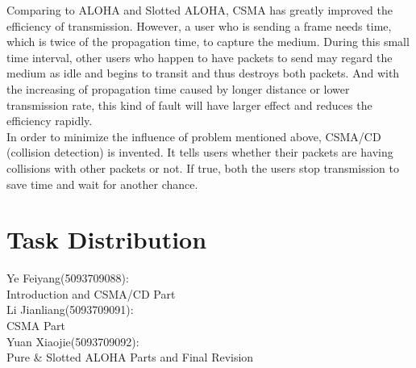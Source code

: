 \documentclass[11pt,a4paper]{report}
\begin{document}
Comparing to ALOHA and Slotted ALOHA, CSMA has greatly improved the efficiency of transmission. However, a user who is sending a frame needs time, which is twice of the propagation time, to capture the medium. During this small time interval, other users who happen to have packets to send may regard the medium as idle and begins to transit and thus destroys both packets. And with the increasing of propagation time caused by longer distance or lower transmission rate, this kind of fault will have larger effect and reduces the efficiency rapidly. \\

In order to minimize the influence of problem mentioned above, CSMA/CD (collision detection) is invented. It tells users whether their packets are having collisions with other packets or not. If true, both the users stop transmission to save time and wait for another chance.

\section*{Task Distribution}
Ye Feiyang(5093709088): \\

\qquad Introduction and CSMA/CD Part \\

Li Jianliang(5093709091): \\

\qquad CSMA Part \\

Yuan Xiaojie(5093709092): \\

\qquad Pure \& Slotted ALOHA Parts and Final Revision
\end{document}
